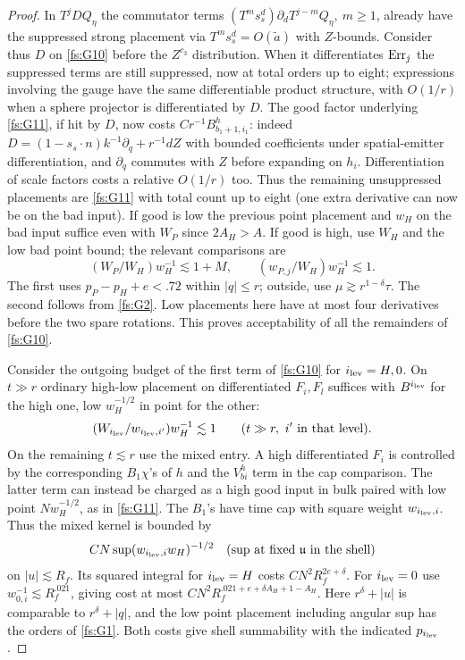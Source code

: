 \begin{proof}
In \(T^j D Q_\eta\) the commutator terms \((T^m s_s^d)\partial_d T^{j-m}Q_\eta,\ m\ge1\), already have the suppressed strong placement via \(T^m s_s^d=O(\widetilde a)\) with \(Z\)-bounds. Consider thus \(D\) on \eqref{fs:G10} before the \(Z^{c_3}\) distribution. When it differentiates \({\rm Err}_j\) the suppressed terms are still suppressed, now at total orders up to eight; expressions involving the gauge have the same differentiable product structure, with \(O(1/r)\) when a sphere projector is differentiated by \(D\). The good factor underlying \eqref{fs:G11}, if hit by \(D\), now costs \(C r^{-1} B^h_{b_1+1,i_1}\): indeed \(D=(1-s_s\cdot n)k^{-1}\partial_q+r^{-1}d Z\) with bounded coefficients under spatial-emitter differentiation, and \(\partial_q\) commutes with \(Z\) before expanding on \(h_i\). Differentiation of scale factors costs a relative \(O(1/r)\) too. Thus the remaining unsuppressed placements are \eqref{fs:G11} with total count up to eight (one extra derivative can now be on the bad input). If good is low the previous point placement and \(w_H\) on the bad input suffice even with \(W_P\) since \(2A_H>A\). If good is high, use \(W_H\) and the low bad point bound; the relevant comparisons are
\[
       (W_P/W_H)w_H^{-1}\lesssim1+M,\qquad
       (w_{P,j}/W_H)w_H^{-1}\lesssim1.
\]
The first uses \(p_P-p_H+e<.72\) within \(|q|\le r\); outside, use \(\mu\gtrsim r^{1-\delta}\tau\). The second follows from \eqref{fs:G2}. Low placements here have at most four derivatives before the two spare rotations. This proves acceptability of all the remainders of \eqref{fs:G10}.

Consider the outgoing budget of the first term of \eqref{fs:G10} for \(i_{\rm lev}=H,0\). On \(t\gg r\) ordinary high-low placement on differentiated \(F_i,F_l\) suffices with \(B^{i_{\rm lev}}\) for the high one, low \(w_H^{-1/2}\) in point for the other:
\[
 (W_{i_{\rm lev}}/w_{i_{\rm lev},i'})w_H^{-1}\lesssim1
                      \qquad(t\gg r,\ i'\ {\rm in\ that\ level}).
\]
On the remaining \(t\lesssim r\) use the mixed entry. A high differentiated \(F_i\) is controlled by the corresponding \(B_1\chi\)'s of \(h\) and the \(V^h_{b i}\) term in the cap comparison. The latter term can instead be charged as a high good input in bulk paired with low point \(N w_H^{-1/2}\), as in \eqref{fs:G11}. The \(B_1\)'s have time cap with square weight \(w_{i_{\rm lev},i}\). Thus the mixed kernel is bounded by
\[
      C N\sup(w_{i_{\rm lev},i}w_H)^{-1/2}
             \quad(\text{sup at fixed }\mathfrak u\text{ in the shell})
\]
on \(|u|\lesssim R_f\). Its squared integral for \(i_{\rm lev}=H\) costs \(C N^2 R_f^{2e+\delta}\). For \(i_{\rm lev}=0\) use \(w_{0,i}^{-1}\lesssim R_f^{.021}\), giving cost at most \(C N^2 R_f^{.021+e+\delta A_H+1-A_H}\). Here \(r^\delta+|u|\) is comparable to \(r^\delta+|q|\), and the low point placement including angular sup has the orders of \eqref{fs:G1}. Both costs give shell summability with the indicated \(p_{i_{\rm lev}}\).


\end{proof}
